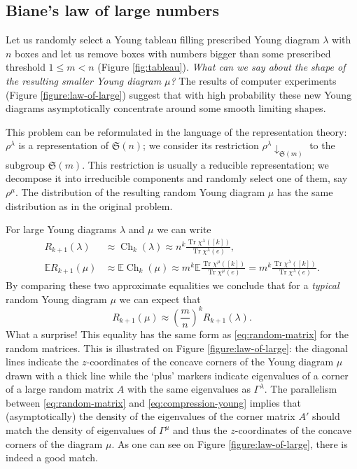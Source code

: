 \documentclass{emsprocart}
\theoremstyle{definition}
\begin{document}
\subsection{Biane's law of large numbers}
\label{subsec:biane}

Let us randomly select a Young tableau filling prescribed Young diagram $\lambda$ with $n$ boxes and let us remove
boxes with numbers bigger than some prescribed threshold $1\leq m<n$ (Figure \ref{fig:tableau}). 
\emph{What can we say about the shape of the resulting smaller Young diagram $\mu$?}
The results of computer experiments (Figure \ref{figure:law-of-large})
suggest that with high probability these new Young diagrams asymptotically concentrate around some smooth limiting shapes.

This problem can be reformulated in the language of the representation theory:
$\rho^\lambda$ is a representation of ${\mathfrak{S}({n})}$; 
we consider its restriction $\rho^\lambda\downarrow_{{\mathfrak{S}({m})}}$ to the subgroup ${\mathfrak{S}({m})}$. This restriction
is usually a reducible representation; we decompose it into irreducible components and randomly select one of them,
say $\rho^\mu$. The distribution of the resulting random Young diagram $\mu$ has the same distribution as in the original problem. 

For large Young diagrams $\lambda$ and $\mu$ we can write
\begin{align*}R_{k+1}(\lambda) & \approx \operatorname{Ch}_k(\lambda) \approx n^k  \frac{\operatorname{Tr} \chi^\lambda([k])}{\operatorname{Tr} \chi^\lambda(e)},\\
{\mathbb{E}} R_{k+1}(\mu) & \approx {\mathbb{E}} \operatorname{Ch}_k(\mu) \approx m^k {\mathbb{E}} \frac{\operatorname{Tr} \chi^\mu([k])}{\operatorname{Tr} \chi^\mu(e)} 
=m^k \frac{\operatorname{Tr} \chi^\lambda([k])}{\operatorname{Tr} \chi^\lambda(e)}. \end{align*}
By comparing these two approximate equalities we conclude that for a \emph{typical} random
Young diagram $\mu$ we can expect that
\begin{equation}
\label{eq:compression-young}
 R_{k+1}(\mu) \approx \left(\frac{m}{n}\right)^k R_{k+1}(\lambda).  
\end{equation}
What a surprise! This equality has the same form as \eqref{eq:random-matrix} for the random matrices.
This is illustrated on Figure \ref{figure:law-of-large}: the diagonal lines indicate the $z$-coordinates
of the concave corners of the Young diagram $\mu$ drawn with a thick line while the `plus' markers indicate
eigenvalues of a corner of a large random matrix $A$ with the same eigenvalues 
as $\Gamma^\lambda$.
The parallelism between \eqref{eq:random-matrix} and \eqref{eq:compression-young} implies that 
(asymptotically) the density of the eigenvalues of the corner matrix $A'$ should match the 
density of eigenvalues of $\Gamma^\mu$ and thus the $z$-coordinates of 
the concave corners of the diagram $\mu$.
As one can see on Figure \ref{figure:law-of-large}, there is indeed a good match.
\end{document}
